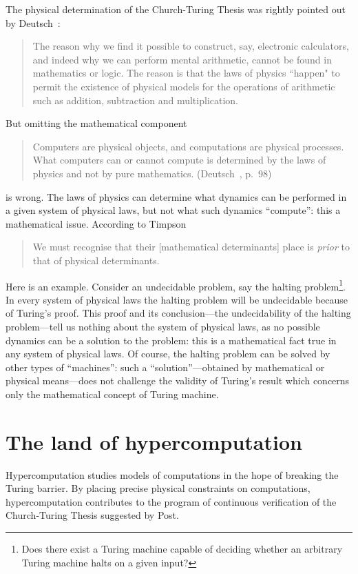 \documentclass[10pt]{article}
\begin{document}
 The physical determination of the Church-Turing Thesis was rightly  pointed out by  Deutsch~\cite{deutsch}:
 \begin{quote}
The reason why we find it possible to construct, say, electronic
calculators, and indeed why we can perform mental arithmetic, cannot be
found in mathematics or logic. The reason is that the laws of
physics ``happen" to permit the existence of physical models for the
operations of arithmetic such as addition, subtraction and
multiplication.
\end{quote}

But omitting the mathematical component

\begin{quote}
Computers are physical objects, and computations are physical processes. What computers can or cannot
compute is determined by the laws of physics and not by pure mathematics. (Deutsch~\cite{deutsch-1997}, p.\ 98)
\end{quote}
is wrong. The laws of physics can determine what dynamics can be performed in a given  system of physical laws, but not what
such dynamics ``compute'': this  a mathematical issue. According to Timpson~\cite{timpson-2004}

\begin{quote}
We must recognise that their [mathematical determinants] place is {\em prior} to that of physical determinants.
\end{quote}
\noindent Here is an example. Consider an undecidable problem, say the halting problem\footnote{Does there exist a Turing machine capable of deciding whether
an arbitrary Turing machine halts on a given input?}. In every system of physical laws the halting problem will
be undecidable  because of Turing's proof. This proof and its conclusion---the undecidability of the halting problem---tell us nothing about  the system of physical laws, as
no possible dynamics can be a solution to the problem: this is a mathematical fact true in any system of physical laws.
Of course, the halting problem can be solved by other types of ``machines'': such a ``solution''---obtained by mathematical or physical means---does not challenge the validity of Turing's result which concerns only the mathematical concept of Turing machine.


\section{The land of hypercomputation}
Hypercomputation  studies models of computations in the hope of breaking the Turing barrier.  By placing precise physical constraints on computations, hypercomputation contributes to the program of
continuous verification of the Church-Turing Thesis suggested by Post.
\end{document}
